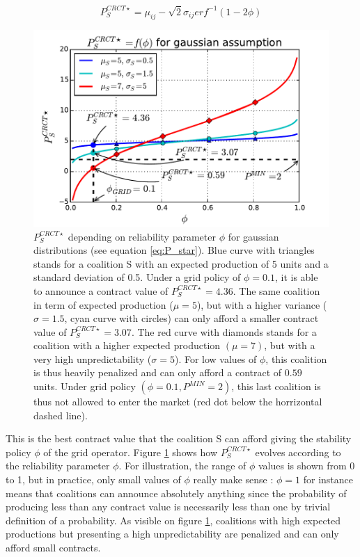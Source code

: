 \documentclass[conference]{IEEEtran}
\begin{document}
\begin{equation}
\label{eq:P_star}
P_{S}^{CRCT \star} = \mu_{ij} - \sqrt{2} \sigma_{ij} erf^{-1}( 1 - 2 \phi )
\end{equation}

\begin{figure}
\includegraphics[scale=.6]{gaussian_P_star.pdf}
\caption{$ P_{S}^{CRCT \star} $ depending on reliability parameter $ \phi $ for gaussian distributions (see equation \ref{eq:P_star}). Blue curve with triangles stands for a coalition S with an expected production of 5 units and a standard deviation of 0.5. Under a grid policy of $ \phi = 0.1 $, it is able to announce a contract value of $ P_{S}^{CRCT \star} = 4.36 $. The same coalition in term of expected production ($\mu = 5 $), but with a higher variance ($ \sigma = 1.5 $, cyan curve with circles) can only afford a smaller contract value of $ P_{S}^{CRCT \star} = 3.07 $. The red curve with diamonds stands for a coalition with a higher expected production $(\mu = 7)$, but with a very high unpredictability ($ \sigma = 5 $). For low values of $ \phi $, this coalition is thus heavily penalized and can only afford a contract of $ 0.59 $ units. Under grid policy $ (\phi = 0.1, P^{MIN} = 2) $, this last coalition is thus not allowed to enter the market (red dot below the horrizontal dashed line). }
\label{fig:Gaussian}
\end{figure}

This is the best contract value that the coalition S can afford giving the stability policy $\phi$ of the grid operator. Figure \ref{fig:Gaussian} shows how $ P_{S}^{CRCT \star} $ evolves according to the reliability parameter $ \phi $. For illustration, the range of $ \phi $ values is shown from 0 to 1, but in practice, only small values of $ \phi $ really make sense : $ \phi = 1 $ for instance means that coalitions can announce absolutely anything since the probability of producing less than any contract value is necessarily less than one by trivial definition of a probability. As visible on figure \ref{fig:Gaussian}, coalitions with high expected productions but presenting a high unpredictability are penalized and can only afford small contracts.  
\end{document}
